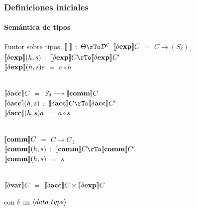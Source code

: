 \documentclass{beamer} %
\begin{document}
\begin{frame}\small
\frametitle{Definiciones iniciales}
\framesubtitle{Sem\'antica de tipos}

\begin{block}{Funtor sobre tipos, $\semBrcks{ \ }$ $:$ $\Theta \rTo \DC$}
$\llbracket  \delta \textbf{exp}  \rrbracket C$ $=$ $C \longrightarrow (S_{ \delta })_\bot$\\
$\llbracket  \delta \textbf{exp}  \rrbracket(h,s)$ $:$ $\semBrcks{ \deltaexp }C \rTo \semBrcks{ \deltaexp }C'$\\
$\llbracket  \delta \textbf{exp}  \rrbracket(h,s)e$ $=$ $e \circ h$ \\
\

$\llbracket  \delta \textbf{acc}  \rrbracket C$ $=$ $S_{\delta} \longrightarrow \llbracket  \textbf{comm}  \rrbracket C$\\
$\llbracket  \delta \textbf{acc}  \rrbracket(h,s)$ $:$ $\semBrcks{ \deltaacc }C \rTo \semBrcks{ \deltaacc }C'$\\
$\llbracket  \delta \textbf{acc}  \rrbracket(h,s)a$ $=$ $a \circ s$\\
\

$\llbracket  \textbf{comm}  \rrbracket C$ $=$ $C \longrightarrow C_\bot$\\
$\llbracket  \textbf{comm}  \rrbracket(h,s)$ $:$ $\semBrcks{ \commt }C \rTo \semBrcks{ \commt }C'$\\
$\llbracket  \textbf{comm}  \rrbracket(h,s)$ $=$ $s$\\
\

$\llbracket  \delta \textbf{var}  \rrbracket C$ $=$ $\llbracket  \delta \textbf{acc}  \rrbracket C \times  \llbracket  \delta \textbf{exp}  \rrbracket C$\\

\end{block}
con $\delta$ un $\langle data \ type \rangle$

\end{frame}
\end{document}

